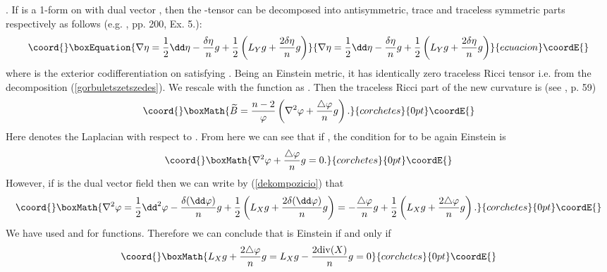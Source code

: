 \documentclass[a4paper,12pt,draft]{article}
\begin{document}
. If \myHighlight{$\eta$}\coordHE{} is a 1-form on \coordHE{} with
dual vector \coordHE{}, then the \coordHE{}-tensor
\myHighlight{$\nabla\eta$}\coordHE{} can be decomposed into antisymmetric, trace and traceless
symmetric parts respectively as follows (e.g. \cite{pet}, pp. 200,
Ex. 5.):
\begin{equation}\coord{}\boxEquation{
\nabla\eta={1\over 2}\dd\eta -{\delta\eta\over n}g+{1\over 2}\left(
L_Yg+{2\delta\eta\over n}g\right)
\label{dekompozicio}
}{
\nabla\eta={1\over 2}\dd\eta -{\delta\eta\over n}g+{1\over 2}\left(
L_Yg+{2\delta\eta\over n}g\right)
}{ecuacion}\coordE{}\end{equation}
where \myHighlight{$\delta$}\coordHE{} is the exterior codifferentiation on \coordHE{}
satisfying \coordHE{}. Being \coordHE{} an Einstein metric, it
has identically zero traceless Ricci tensor i.e. \coordHE{} from the
decomposition (\ref{gorbuletszetszedes}). We rescale
\coordHE{} with the function \coordHE{} as
\coordHE{}. Then the traceless Ricci part of the new
curvature is (see \cite{bes}, p. 59)
\[\coord{}\boxMath{\widetilde{B}= {n-2\over\varphi}\left(\nabla^2\varphi
+{\triangle\varphi\over n}g\right) .}{corchetes}{0pt}\coordE{}\]  
Here \myHighlight{$\triangle$}\coordHE{} denotes the Laplacian with respect to \coordHE{}. From here we
can see that if \coordHE{}, the condition for \coordHE{} to be again Einstein
is
\[\coord{}\boxMath{\nabla^2\varphi +{\triangle\varphi\over n}g =0.}{corchetes}{0pt}\coordE{}\]
However, if \coordHE{} is the dual vector
field then we can write by (\ref{dekompozicio}) that
\[\coord{}\boxMath{\nabla^2\varphi ={1\over 2}\dd^2\varphi -{\delta (\dd\varphi
)\over n}g+{1\over 2}\left( L_Xg+{2\delta (\dd\varphi )\over n}g\right) =
-{\triangle\varphi\over n}g+{1\over 2}\left( L_Xg+{2\triangle\varphi\over 
n}g\right).}{corchetes}{0pt}\coordE{}\]
We have used \coordHE{} and \myHighlight{$\delta\dd =\triangle$}\coordHE{} for functions. Therefore
we can conclude that \coordHE{} is Einstein if and only if
\[\coord{}\boxMath{L_Xg+{2\triangle\varphi\over n}g=L_Xg-{2{\rm div}(X)\over n}g=0}{corchetes}{0pt}\coordE{}\]
\end{document}
